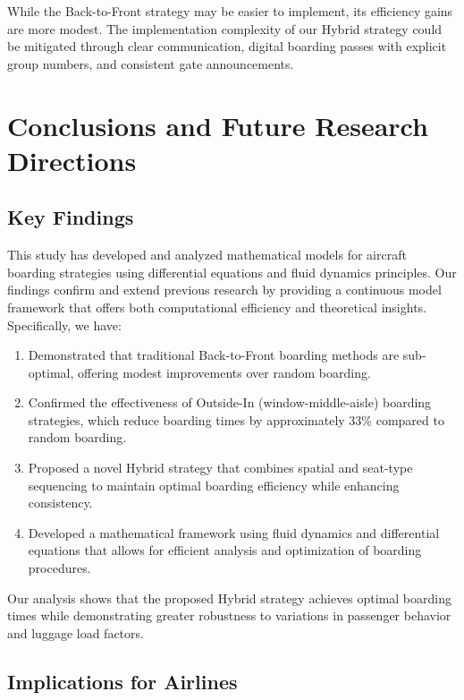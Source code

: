 \documentclass[12pt]{article}
\begin{document}
While the Back-to-Front strategy may be easier to implement, its efficiency gains are more modest. The implementation complexity of our Hybrid strategy could be mitigated through clear communication, digital boarding passes with explicit group numbers, and consistent gate announcements.

\section{Conclusions and Future Research Directions}

\subsection{Key Findings}

This study has developed and analyzed mathematical models for aircraft boarding strategies using differential equations and fluid dynamics principles. Our findings confirm and extend previous research by providing a continuous model framework that offers both computational efficiency and theoretical insights. Specifically, we have:

\begin{enumerate}
    \item Demonstrated that traditional Back-to-Front boarding methods are sub-optimal, offering modest improvements over random boarding.
    
    \item Confirmed the effectiveness of Outside-In (window-middle-aisle) boarding strategies, which reduce boarding times by approximately 33\% compared to random boarding.
    
    \item Proposed a novel Hybrid strategy that combines spatial and seat-type sequencing to maintain optimal boarding efficiency while enhancing consistency.
    
    \item Developed a mathematical framework using fluid dynamics and differential equations that allows for efficient analysis and optimization of boarding procedures.
\end{enumerate}

Our analysis shows that the proposed Hybrid strategy achieves optimal boarding times while demonstrating greater robustness to variations in passenger behavior and luggage load factors.

\subsection{Implications for Airlines}
\end{document}
